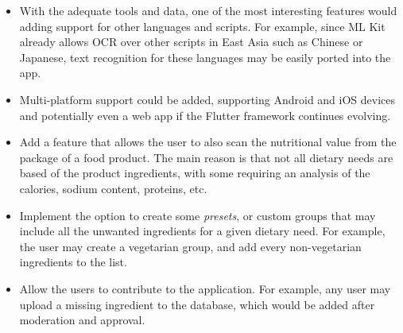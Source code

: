 \begin{itemize}
\item With the adequate tools and data, one of the most interesting features would adding support for other languages and scripts. For example, since ML Kit already allows OCR over other scripts in East Asia such as Chinese or Japanese, text recognition for these languages may be easily ported into the app.
\item Multi-platform support could be added, supporting Android and iOS devices and potentially even a web app if the Flutter framework continues evolving.
\item Add a feature that allows the user to also scan the nutritional value from the package of a food product. The main reason is that not all dietary needs are based of the product ingredients, with some requiring an analysis of the calories, sodium content, proteins, etc.
\item Implement the option to create some \textit{presets}, or custom groups that may include all the unwanted ingredients for a given dietary need. For example, the user may create a vegetarian group, and add every non-vegetarian ingredients to the list. 
\item Allow the users to contribute to the application. For example, any user may upload a missing ingredient to the database, which would be added after moderation and approval.
\end{itemize}

